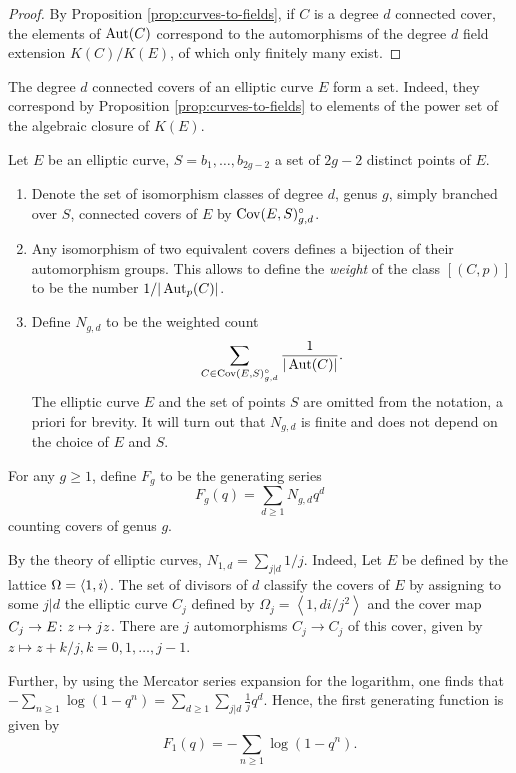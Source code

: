 \begin{proof}
 By Proposition \ref{prop:curves-to-fields}, if $C$ is a degree $d$ connected cover, the elements of $\operatorname{Aut}(C)$ correspond to the automorphisms of the degree $d$ field extension $K(C)/K(E)$, of which only finitely many exist.
\end{proof}

\begin{rmk}
 The degree $d$ connected covers of an elliptic curve $E$ form a set. Indeed, they correspond by Proposition \ref{prop:curves-to-fields} to elements of the power set of the algebraic closure of $K(E)$.
\end{rmk}

\begin{defi} Let $E$ be an elliptic curve, $S={b_1,\dotsc,b_{2g-2}}$ a set of $2g-2$ distinct points of $E$.
 \begin{enumerate}
  \item Denote the set of isomorphism classes of degree $d$, genus $g$, simply branched over $S$, connected covers of $E$ by $\operatorname{Cov}(E,S)^{\circ}_{g,d}$.
  
  \item Any isomorphism of two equivalent covers defines a bijection of their automorphism groups. This allows to define the \emph{weight} of the class $[(C,p)]$ to be the number $1/|\operatorname{Aut}_p(C)|$.
  
  \item Define $N_{g,d}$ to be the weighted count \[\sum_{C\in \operatorname{Cov}(E,S)^{\circ}_{g,d}} \frac{1}{|\operatorname{Aut}(C)|}.\] The elliptic curve $E$ and the set of points $S$ are omitted from the notation, a priori for brevity. It will turn out that $N_{g,d}$ is finite and does not depend on the choice of $E$ and $S$.
 \end{enumerate}
\end{defi}

\begin{defi}
 For any $g\geq 1$, define $F_g$ to be the generating series \[F_g(q)=\sum_{d\geq 1}N_{g,d}q^d\] counting covers of genus $g$.
\end{defi}

\begin{expl}
 By the theory of elliptic curves, $N_{1,d}=\sum_{j|d}1/j$. Indeed, Let $E$ be defined by the lattice $\Omega=\left\langle 1,i \right\rangle$. The set of divisors of $d$ classify the covers of $E$ by assigning to some $j|d$ the elliptic curve $C_j$ defined by $\Omega_j=\left<1,di/j^2\right>$ and the cover map $C_j\to E\colon z\mapsto jz$. There are $j$ automorphisms $C_j\to C_j$ of this cover, given by $z\mapsto z+k/j, k=0,1,\dotsc,j-1$.
 
 Further, by using the Mercator series expansion for the logarithm, one finds that $-\sum_{n\geq 1}\log(1-q^n)=\sum_{d\geq 1}\sum_{j|d}\frac{1}{j}q^d.$
 Hence, the first generating function is given by \[F_1(q)=-\sum_{n\geq 1}\log(1-q^n).\]
\end{expl}

